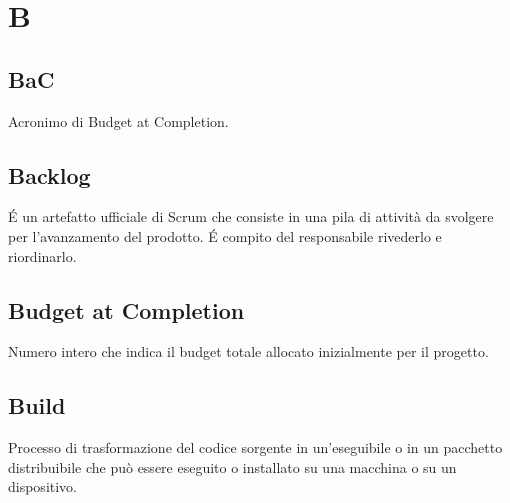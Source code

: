 \section{B}
\subsection{BaC}%
Acronimo di Budget at Completion.

\subsection{Backlog}%
É un artefatto ufficiale di Scrum che consiste in una pila di attività da svolgere per l'avanzamento del prodotto. É compito del responsabile rivederlo e riordinarlo.

\subsection{Budget at Completion}%
Numero intero che indica il budget totale allocato inizialmente per il progetto.

\subsection{Build}
Processo di trasformazione del codice sorgente in un'eseguibile o in un pacchetto distribuibile che può essere eseguito o installato su una macchina o su un dispositivo.
\clearpage